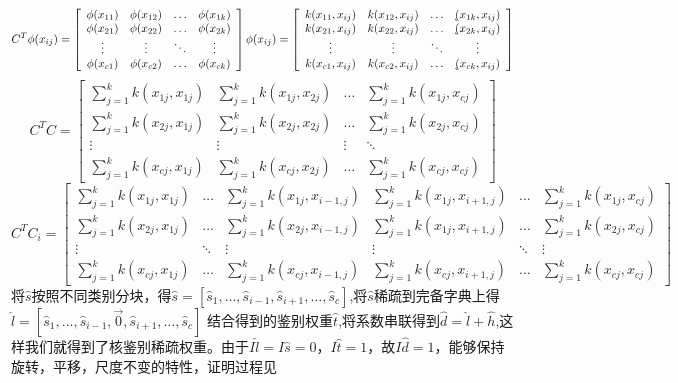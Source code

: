 \begin{displaymath}
	C^{T}\phi{(x_{ij})}=
		\left[
			\begin{array}{cccc}
				\phi{(x_{11})} & \phi{(x_{12})} & \ldots & \phi{(x_{1k})}\\
				\phi{(x_{21})} & \phi{(x_{22})} & \ldots & \phi{(x_{2k})}\\
				\vdots & \vdots & \ddots & \vdots\\
				\phi{(x_{c1})} & \phi{(x_{c2})} & \ldots & \phi{(x_{ck})}
			\end{array}
		\right]\phi{(x_{ij})}
		=\left[
			\begin{array}{cccc}
			  k(x_{11},x_{ij}) & k(x_{12},x_{ij}) & \ldots &\k(x_{1k},x_{ij}) \\
			  k(x_{21},x_{ij}) & k(x_{22},x_{ij}) & \ldots &\k(x_{2k},x_{ij}) \\
			  \vdots & \vdots & \ddots & \vdots \\
			  k(x_{c1},x_{ij}) & k(x_{c2},x_{ij}) & \ldots &\k(x_{ck},x_{ij}) 
			\end{array}
		 \right]
\end{displaymath}
\begin{displaymath}
	C^{T}C=
		\left[
			\begin{array}{cccc}
				\sum_{j=1}^{k}k(x_{1j},x_{1j}) & \sum_{j=1}^{k}k(x_{1j},x_{2j}) & \ldots & \sum_{j=1}^{k}k(x_{1j},x_{cj}) \\
				\sum_{j=1}^{k}k(x_{2j},x_{1j}) & \sum_{j=1}^{k}k(x_{2j},x_{2j}) & \ldots & \sum_{j=1}^{k}k(x_{2j},x_{cj}) \\
				\vdots & \vdots & \vdots & \ddots \\
				\sum_{j=1}^{k}k(x_{cj},x_{1j}) & \sum_{j=1}^{k}k(x_{cj},x_{2j}) & \ldots & \sum_{j=1}^{k}k(x_{cj},x_{cj}) 
			\end{array}
		\right]
\end{displaymath}
\begin{displaymath}
	C^{T}C_{i}=
		\left[
			\begin{array}{cccccc}
				\sum_{j=1}^{k}k(x_{1j},x_{1j}) & \ldots & \sum_{j=1}^{k}k(x_{1j},x_{i-1,j}) & \sum_{j=1}^{k}k(x_{1j},x_{i+1,j}) &\ldots & \sum_{j=1}^{k}k(x_{1j},x_{cj}) \\
				\sum_{j=1}^{k}k(x_{2j},x_{1j}) & \ldots & \sum_{j=1}^{k}k(x_{2j},x_{i-1,j}) & \sum_{j=1}^{k}k(x_{1j},x_{i+1,j}) &\ldots & \sum_{j=1}^{k}k(x_{2j},x_{cj}) \\
				\vdots & \ddots & \vdots & \vdots & \ddots & \vdots \\
				\sum_{j=1}^{k}k(x_{cj},x_{1j}) &\ldots & \sum_{j=1}^{k}k(x_{cj},x_{i-1,j}) & \sum_{j=1}^{k}k(x_{cj},x_{i+1,j}) &\ldots & \sum_{j=1}^{k}k(x_{cj},x_{cj}) 
			\end{array}
		\right]
\end{displaymath}
将$\hat{s}$按照不同类别分块，得$\hat{s}=[\hat{s}_{1},\ldots,\hat{s}_{i-1},\hat{s}_{i+1},\ldots,\hat{s}_{c}]$,将$\hat{s}$稀疏到完备字典上得$\hat{l}=[\hat{s}_{1},\ldots,\hat{s}_{i-1},\vec{0},\hat{s}_{i+1},\ldots,\hat{s}_{c}]$ 结合得到的鉴别权重$\hat{t}$,将系数串联得到$\hat{d}=\hat{l}+\hat{h}$,这样我们就得到了核鉴别稀疏权重。由于$I\hat{l}=I\hat{s}=0$，$I\hat{t}=1$，故$I\hat{d}=1$，能够保持旋转，平移，尺度不变的特性，证明过程见\cite{马小虎2014基于鉴别稀疏保持嵌入的人脸识别算法}

